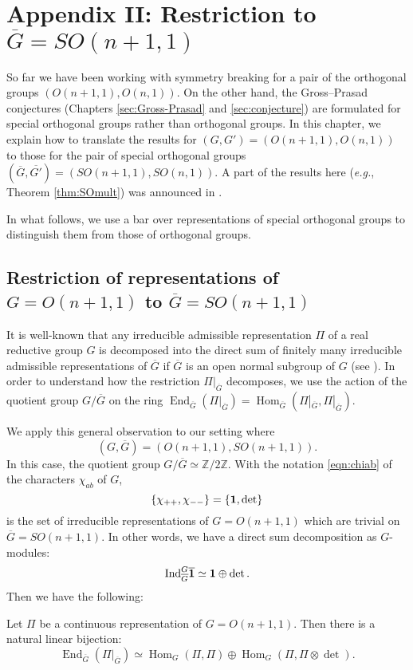 \newpage
\section{Appendix II: Restriction to $\overline G=SO(n+1,1)$}
\label{sec:SOrest}

So far we have been working with symmetry breaking for a pair of the orthogonal groups
 $(O(n+1,1), O(n,1))$.  
On the other hand, 
 the Gross--Prasad conjectures
 (Chapters \ref{sec:Gross-Prasad} and \ref{sec:conjecture})
 are formulated for special orthogonal groups
 rather than orthogonal groups.  
In this chapter, 
 we explain how to translate the results 
 for $(G, G')=(O(n+1,1), O(n,1))$
 to those for the pair of special orthogonal groups
 $(\overline{G},\overline{G'})=(SO(n+1,1), SO(n,1))$.  
A part of the results here 
({\it{e.g.}}, Theorem \ref{thm:SOmult}) was announced in \cite{sbonGP}.  



In what follows, 
 we use a bar over representations of special orthogonal groups
 to distinguish them from those of orthogonal groups.  


\subsection{Restriction of representations of $G=O(n+1,1)$ to $\overline G= SO(n+1,1)$}
\label{subsec:SO}

It is well-known that any irreducible admissible representation $\Pi$
 of a real reductive group $G$ is decomposed into the direct sum 
 of finitely many irreducible admissible representations of $\overline G$
if $\overline G$ is an open normal subgroup of $G$
 (see \cite[Chap.~II, Lem.~5.5]{BW}).  
In order to understand
 how the restriction $\Pi|_{\overline G}$ decomposes,
 we use the action
 of the quotient group $G/\overline G$
 on the ring ${\operatorname{End}}_{\overline G}(\Pi|_{\overline G}) =
 {\operatorname{Hom}}_{\overline G}(\Pi|_{\overline G}, \Pi|_{\overline G})$.  



We apply this general observation to our setting 
where 
\[(G,\overline G)=(O(n+1,1), SO(n+1,1)).  
\]
In this case, 
 the quotient group $G/\overline G \simeq {\mathbb{Z}}/2 {\mathbb{Z}}$.  
With the notation \eqref{eqn:chiab} of the characters $\chi_{a b}$ of $G$, 
\[
   \{\chi_{++}, \chi_{--}\}=\{{\bf{1}}, \det\}
\]
 is the set
 of irreducible representations
 of $G=O(n+1,1)$
 which are trivial on $\overline G=S O(n+1,1)$.  
In other words,
 we have a direct sum decomposition as $G$-modules:
\[
   {\operatorname{Ind}}_{\overline G}^G \overline{\bf{1}}
  \simeq
   {\bf{1}} \oplus \det.  
\]
Then we have the following:
\begin{lemma}
\label{lem:LNM26}
Let $\Pi$ be a continuous representation of $G=O(n+1,1)$.  
Then there is a natural linear bijection:
\[
  {\operatorname{End}}_{\overline{G}}(\Pi|_{\overline{G}})
\simeq
  \operatorname{Hom}_{G}(\Pi, \Pi)
  \oplus
  \operatorname{Hom}_{G}(\Pi, \Pi \otimes \det).  
\]
\end{lemma}

